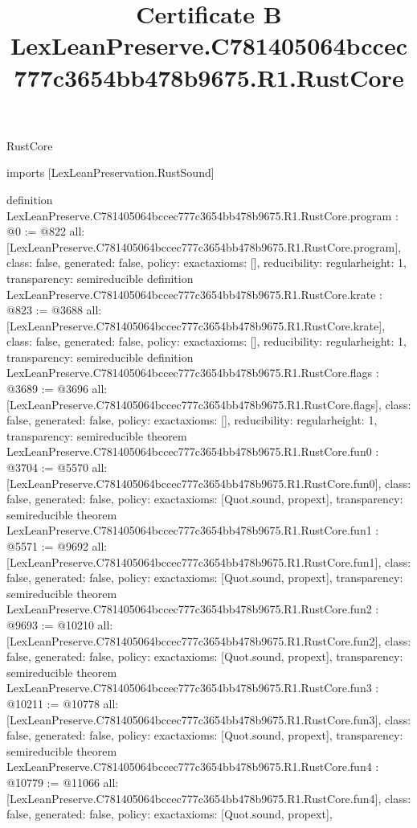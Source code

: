 \begin{lexlean}{RustCore}
\title{Certificate B LexLeanPreserve.C781405064bccec777c3654bb478b9675.R1.RustCore}
\begin{coremodule}
imports [LexLeanPreservation.RustSound]

definition LexLeanPreserve.C781405064bccec777c3654bb478b9675.R1.RustCore.program : @0 := @822 {
  all: [LexLeanPreserve.C781405064bccec777c3654bb478b9675.R1.RustCore.program],
  class: false,
  generated: false,
  policy: exact{axioms: []},
  reducibility: regular{height: 1},
  transparency: semireducible
}
definition LexLeanPreserve.C781405064bccec777c3654bb478b9675.R1.RustCore.krate : @823 := @3688 {
  all: [LexLeanPreserve.C781405064bccec777c3654bb478b9675.R1.RustCore.krate],
  class: false,
  generated: false,
  policy: exact{axioms: []},
  reducibility: regular{height: 1},
  transparency: semireducible
}
definition LexLeanPreserve.C781405064bccec777c3654bb478b9675.R1.RustCore.flags : @3689 := @3696 {
  all: [LexLeanPreserve.C781405064bccec777c3654bb478b9675.R1.RustCore.flags],
  class: false,
  generated: false,
  policy: exact{axioms: []},
  reducibility: regular{height: 1},
  transparency: semireducible
}
theorem LexLeanPreserve.C781405064bccec777c3654bb478b9675.R1.RustCore.fun0 : @3704 := @5570 {
  all: [LexLeanPreserve.C781405064bccec777c3654bb478b9675.R1.RustCore.fun0],
  class: false,
  generated: false,
  policy: exact{axioms: [Quot.sound, propext]},
  transparency: semireducible
}
theorem LexLeanPreserve.C781405064bccec777c3654bb478b9675.R1.RustCore.fun1 : @5571 := @9692 {
  all: [LexLeanPreserve.C781405064bccec777c3654bb478b9675.R1.RustCore.fun1],
  class: false,
  generated: false,
  policy: exact{axioms: [Quot.sound, propext]},
  transparency: semireducible
}
theorem LexLeanPreserve.C781405064bccec777c3654bb478b9675.R1.RustCore.fun2 : @9693 := @10210 {
  all: [LexLeanPreserve.C781405064bccec777c3654bb478b9675.R1.RustCore.fun2],
  class: false,
  generated: false,
  policy: exact{axioms: [Quot.sound, propext]},
  transparency: semireducible
}
theorem LexLeanPreserve.C781405064bccec777c3654bb478b9675.R1.RustCore.fun3 : @10211 := @10778 {
  all: [LexLeanPreserve.C781405064bccec777c3654bb478b9675.R1.RustCore.fun3],
  class: false,
  generated: false,
  policy: exact{axioms: [Quot.sound, propext]},
  transparency: semireducible
}
theorem LexLeanPreserve.C781405064bccec777c3654bb478b9675.R1.RustCore.fun4 : @10779 := @11066 {
  all: [LexLeanPreserve.C781405064bccec777c3654bb478b9675.R1.RustCore.fun4],
  class: false,
  generated: false,
  policy: exact{axioms: [Quot.sound, propext]},
}
\end{coremodule}
\end{lexlean}

